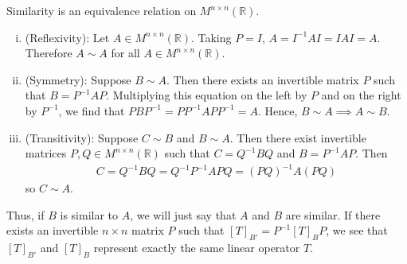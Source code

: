 \documentclass[12pt,letterpaper,reqno]{article}
\numberwithin{equation}{section}
\newcommand{\R}{\ensuremath{\mathbb R}}
\begin{document}
\begin{prop}
Similarity is an equivalence relation on $M^{n \times n}(\R)$.	
\end{prop}

\begin{pf}
\begin{enumerate}[(i)]
	\item (Reflexivity): Let $A \in M^{n \times n}(\R)$. Taking $P=I$, $A=I^{-1}AI=IAI=A$. Therefore $A \sim A$ for all $A \in M^{n \times n}(\R)$.
	\item (Symmetry): Suppose $B \sim A$. Then there exists an invertible matrix $P$ such that $B=P^{-1}AP$. Multiplying this equation on the left by $P$ and on the right by $P^{-1}$, we find that $PBP^{-1}=PP^{-1}APP^{-1}=A$. Hence, $B \sim A \implies A \sim B$.
	\item (Transitivity): Suppose $C \sim B$ and $B \sim A$. Then there exist invertible matrices $P,Q \in M^{n \times n}(\R)$ such that $C=Q^{-1}BQ$ and $B=P^{-1}AP$. Then
		\begin{align*}
			C=Q^{-1}BQ=Q^{-1}P^{-1}APQ=(PQ)^{-1}A(PQ)
		\end{align*}
		so $C \sim A$.
\end{enumerate}	
\end{pf}
Thus, if $B$ is similar to $A$, we will just say that $A$ and $B$ are similar. If there exists an invertible $n \times n$ matrix $P$ such that $[T]_{B'}=P^{-1}[T]_BP$, we see that $[T]_{B'}$ and $[T]_B$ represent exactly the same linear operator $T$.
\end{document}
